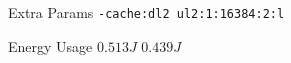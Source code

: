 
        \begin{tcolorbox}[width=\linewidth, colback=white!95!black, colframe=white!95!black]
            
            
            Extra Params \hfill \verb|-cache:dl2 ul2:1:16384:2:l|

            Energy Usage \hfill \st{$0.513J$} $0.439J$

        \end{tcolorbox}
    